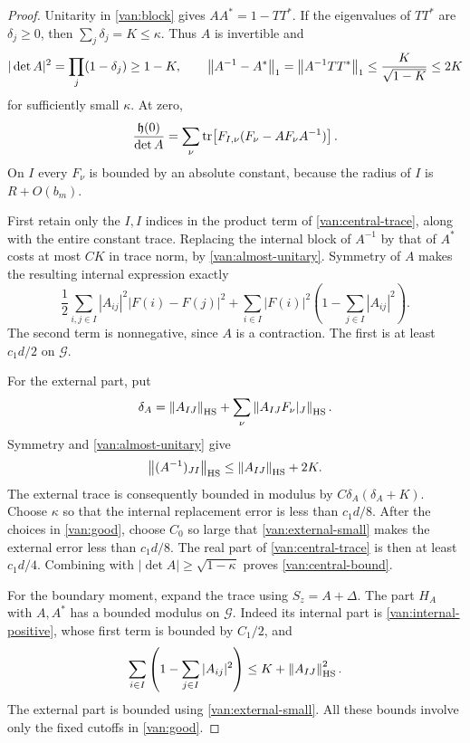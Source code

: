 \begin{proof}
Unitarity in \cref{van:block} gives $AA^*=1-TT^*$. If the
eigenvalues of $TT^*$ are $\delta_j\geq0$, then
$\sum_j\delta_j=K\leq\kappa$. Thus $A$ is invertible and
\begin{equation}\label{van:almost-unitary}
 |\det A|^2=\prod_j(1-\delta_j)\geq1-K,
 \qquad
 \left\lVert A^{-1}-A^*\right\rVert_1
 =\left\lVert A^{-1}TT^*\right\rVert_1
 \leq\frac{K}{\sqrt{1-K}}\leq2K
\end{equation}
for sufficiently small $\kappa$. At zero,
\begin{equation}\label{van:central-trace}
 \frac{\mathfrak h(0)}{\det A}
 =\sum_\nu\operatorname{tr}\!\left[F_{I,\nu}
                      (F_\nu-AF_\nu A^{-1})\right].
\end{equation}
On $I$ every $F_\nu$ is bounded by an absolute constant, because
the radius of $I$ is $R+O(b_m)$.

First retain only the $I,I$ indices in the product term of
\cref{van:central-trace}, along with the entire constant trace.
Replacing the internal block of $A^{-1}$ by that of $A^*$ costs at
most $CK$ in trace norm, by \cref{van:almost-unitary}. Symmetry of
$A$ makes the resulting internal expression exactly
\begin{equation}\label{van:internal-positive}
 \frac12\sum_{i,j\in I}|A_{ij}|^2|F(i)-F(j)|^2
 +\sum_{i\in I}|F(i)|^2
                  \left(1-\sum_{j\in I}|A_{ij}|^2\right).
\end{equation}
The second term is nonnegative, since $A$ is a contraction. The
first is at least $c_1d/2$ on $\mathcal G$.

For the external part, put
\[
 \delta_A=\left\lVert A_{IJ}\right\rVert_{\mathrm{HS}}
       +\sum_\nu\left\lVert A_{IJ}F_\nu|_J\right\rVert_{\mathrm{HS}}.
\]
Symmetry and \cref{van:almost-unitary} give
\[
 \left\lVert(A^{-1})_{JI}\right\rVert_{\mathrm{HS}}
 \leq\left\lVert A_{IJ}\right\rVert_{\mathrm{HS}}+2K.
\]
The external trace is consequently bounded in modulus by
$C\delta_A(\delta_A+K)$. Choose $\kappa$ so that the internal
replacement error is less than $c_1d/8$. After the choices in
\cref{van:good}, choose $C_0$ so large that
\cref{van:external-small} makes the external error less than
$c_1d/8$. The real part of \cref{van:central-trace} is then at
least $c_1d/4$. Combining with $|\det A|\geq\sqrt{1-\kappa}$
proves \cref{van:central-bound}.

For the boundary moment, expand the trace using $S_z=A+\Delta$.
The part $H_A$ with $A,A^*$ has a bounded modulus on $\mathcal G$.
Indeed its internal part is \cref{van:internal-positive}, whose
first term is bounded by $C_1/2$, and
\[
 \sum_{i\in I}\left(1-\sum_{j\in I}|A_{ij}|^2\right)
 \leq K+\left\lVert A_{IJ}\right\rVert_{\mathrm{HS}}^2.
\]
The external part is bounded using
\cref{van:external-small}. All these bounds involve only the fixed
cutoffs in \cref{van:good}.


\end{proof}
